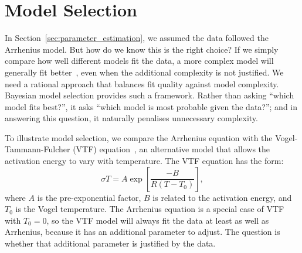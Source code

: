 \documentclass[reprint,superscriptaddress,nobibnotes,nofootinbib,amsmath,amssymb,aps,hidelinks]{revtex4-2}
\begin{document}
\section{Model Selection}
\label{sec:model}

In Section~\ref{sec:parameter_estimation}, we assumed the data followed the Arrhenius model. 
But how do we know this is the right choice? 
If we simply compare how well different models fit the data, a more complex model will generally fit better~\cite{Mayer2010}, even when the additional complexity is not justified. 
We need a rational approach that balances fit quality against model complexity.
Bayesian model selection provides such a framework. 
Rather than asking ``which model fits best?'', it asks ``which model is most probable given the data?''; and in answering this question, it naturally penalises unnecessary complexity.

To illustrate model selection, we compare the Arrhenius equation with the Vogel-Tammann-Fulcher (VTF) equation~\cite{Vogel1921, Tammann1926, Fulcher1925}, an alternative model that allows the activation energy to vary with temperature. 
The VTF equation has the form:
\begin{equation}
    \sigma T = A\exp{\left[\frac{-B}{R(T-T_0)}\right]},
    \label{eqn:vtf}
\end{equation}
where $A$ is the pre-exponential factor, $B$ is related to the activation energy, and $T_0$ is the Vogel temperature. 
The Arrhenius equation is a special case of VTF with $T_0 = 0$, so the VTF model will always fit the data at least as well as Arrhenius, because it has an additional parameter to adjust. 
The question is whether that additional parameter is justified by the data.
\end{document}

